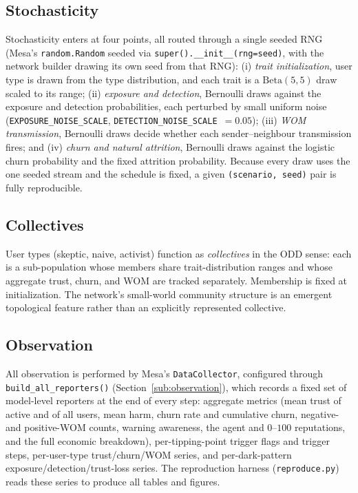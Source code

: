 \documentclass[11pt]{article}
\newcommand{\code}[1]{\texttt{#1}}
\begin{document}
\subsection{Stochasticity}
Stochasticity enters at four points, all routed through a single seeded RNG
(Mesa's \code{random.Random} seeded via \code{super().\_\_init\_\_(rng=seed)},
with the network builder drawing its own seed from that RNG):
(i) \emph{trait initialization}, user type is drawn from the type
distribution, and each trait is a $\mathrm{Beta}(5,5)$ draw scaled to its range;
(ii) \emph{exposure and detection}, Bernoulli draws against the exposure and
detection probabilities, each perturbed by small uniform noise
(\code{EXPOSURE\_NOISE\_SCALE}, \code{DETECTION\_NOISE\_SCALE}~$=0.05$);
(iii) \emph{WOM transmission}, Bernoulli draws decide whether each
sender--neighbour transmission fires; and (iv) \emph{churn and natural attrition}, Bernoulli draws against the logistic churn probability and the fixed
attrition probability. Because every draw uses the one seeded stream and the
schedule is fixed, a given \texttt{(scenario, seed)} pair is fully reproducible.

\subsection{Collectives}
User types (skeptic, naive, activist) function as \emph{collectives} in the ODD
sense: each is a sub-population whose members share trait-distribution ranges and
whose aggregate trust, churn, and WOM are tracked separately. Membership is fixed
at initialization. The network's small-world community structure is an emergent
topological feature rather than an explicitly represented collective.

\subsection{Observation}
All observation is performed by Mesa's \code{DataCollector}, configured through
\code{build\_all\_reporters()} (Section~\ref{sub:observation}), which records a
fixed set of model-level reporters at the end of every step: aggregate metrics
(mean trust of active and of all users, mean harm, churn rate and cumulative
churn, negative- and positive-WOM counts, warning awareness, the agent and
$0$--$100$ reputations, and the full economic breakdown), per-tipping-point
trigger flags and trigger steps, per-user-type trust/churn/WOM series, and
per-dark-pattern exposure/detection/trust-loss series. The reproduction harness
(\code{reproduce.py}) reads these series to produce all tables and figures.
\end{document}
